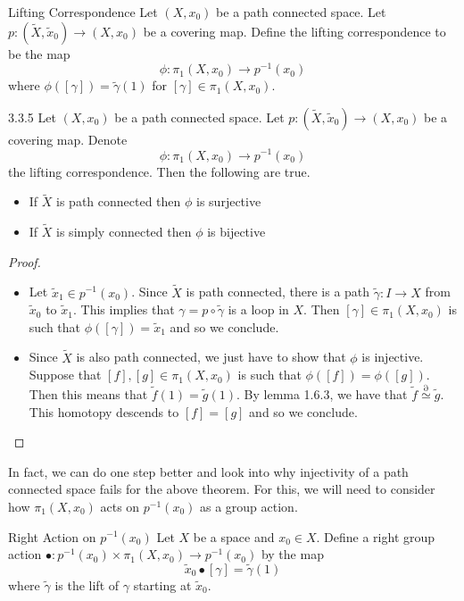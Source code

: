 \documentclass[a4paper]{article}
\begin{document}
\begin{defn}{Lifting Correspondence}{} Let $(X,x_0)$ be a path connected space. Let $p:(\tilde{X},\tilde{x}_0)\to(X,x_0)$ be a covering map. Define the lifting correspondence to be the map $$\phi:\pi_1(X,x_0)\to p^{-1}(x_0)$$ where $\phi([\gamma])=\tilde{\gamma}(1)$ for $[\gamma]\in\pi_1(X,x_0)$. 
\end{defn}

\begin{thm}{}{3.3.5} Let $(X,x_0)$ be a path connected space. Let $p:(\tilde{X},\tilde{x}_0)\to(X,x_0)$ be a covering map. Denote $$\phi:\pi_1(X,x_0)\to p^{-1}(x_0)$$ the lifting correspondence. Then the following are true. 
\begin{itemize}
\item If $\tilde{X}$ is path connected then $\phi$ is surjective
\item If $\tilde{X}$ is simply connected then $\phi$ is bijective
\end{itemize}\tcbline
\begin{proof}~\\
\begin{itemize}
\item Let $\tilde{x}_1\in p^{-1}(x_0)$. Since $\tilde{X}$ is path connected, there is a path $\tilde{\gamma}:I\to X$ from $\tilde{x}_0$ to $\tilde{x}_1$. This implies that $\gamma=p\circ\tilde{\gamma}$ is a loop in $X$. Then $[\gamma]\in\pi_1(X,x_0)$ is such that $\phi([\gamma])=\tilde{x}_1$ and so we conclude. 
\item Since $\tilde{X}$ is also path connected, we just have to show that $\phi$ is injective. Suppose that $[f],[g]\in\pi_1(X,x_0)$ is such that $\phi([f])=\phi([g])$. Then this means that $\tilde{f}(1)=\tilde{g}(1)$. By lemma 1.6.3, we have that $\tilde{f}\overset{\partial}{\simeq}\tilde{g}$. This homotopy descends to $[f]=[g]$ and so we conclude. 
\end{itemize}
\end{proof}
\end{thm}

In fact, we can do one step better and look into why injectivity of a path connected space fails for the above theorem. For this, we will need to consider how $\pi_1(X,x_0)$ acts on $p^{-1}(x_0)$ as a group action. 

\begin{defn}{Right Action on $p^{-1}(x_0)$}{} Let $X$ be a space and $x_0\in X$. Define a right group action $\bullet:p^{-1}(x_0)\times\pi_1(X,x_0)\to p^{-1}(x_0)$ by the map $$\tilde{x}_0\bullet[\gamma]=\tilde{\gamma}(1)$$ where $\tilde{\gamma}$ is the lift of $\gamma$ starting at $\tilde{x}_0$. 
\end{defn}
\end{document}

